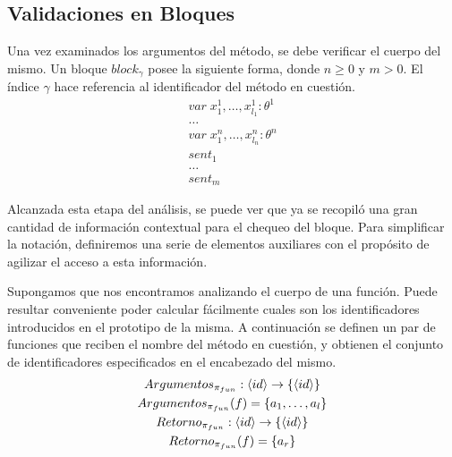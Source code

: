 \documentclass{article}
\begin{document}


\subsection{Validaciones en Bloques}

Una vez examinados los argumentos del método, se debe verificar el cuerpo del mismo.
Un bloque $block_\gamma$ posee la siguiente forma, donde $n \geq 0$ y $m > 0$.
El índice $\gamma$ hace referencia al identificador del método en cuestión.
\begin{gather*}
var \; x^1_1, \ldots, x^1_{l_1}: \theta^1
\\
\ldots
\\
var \; x^n_1, \ldots, x^n_{l_n}: \theta^n
\\
sent_1
\\
\ldots
\\
sent_m
\end{gather*}

Alcanzada esta etapa del análisis, se puede ver que ya se recopiló una gran cantidad de información contextual para el chequeo del bloque.
Para simplificar la notación, definiremos una serie de elementos auxiliares con el propósito de agilizar el acceso a esta información.

Supongamos que nos encontramos analizando el cuerpo de una función.
Puede resultar conveniente poder calcular fácilmente cuales son los identificadores introducidos en el prototipo de la misma.
A continuación se definen un par de funciones que reciben el nombre del método en cuestión, y obtienen el conjunto de identificadores especificados en el encabezado del mismo.
\begin{gather*}
Argumentos_{\pi_{fun}}: \langle id \rangle \rightarrow \{ \langle id \rangle \}
\\
Argumentos_{\pi_{fun}}(f) = \{ a_1, \ldots, a_l \}
\\
Retorno_{\pi_{fun}}: \langle id \rangle \rightarrow \{ \langle id \rangle \}
\\
Retorno_{\pi_{fun}}(f) = \{ a_r \}
\end{gather*}
\end{document}
